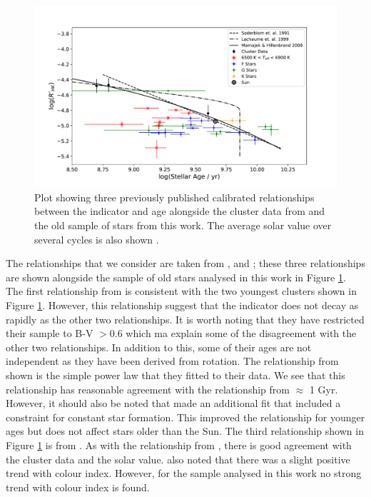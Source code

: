\begin{figure}
    \centering
    \includegraphics[scale=0.55]{Figures/4-Chromospheric_age/ca_results_3_relationship.pdf}
    \caption[Comparison of sample to previous age-activity relationships]{Plot showing three previously published calibrated relationships between the \Rprime indicator and age \citep{Soderblom_etal_1991,Lachaume_etal_1999,Mamajek_Hillenbrand_2008} alongside the cluster data from \citet{Mamajek_Hillenbrand_2008} and the old sample of stars from this work. The average solar value over several cycles is also shown \citep{Egeland_etal_2017}.}
    \label{fig:comparison_previous_relationships_ca}
\end{figure}

The relationships that we consider are taken from \citet{Soderblom_etal_1991}, \citet{Lachaume_etal_1999} and \citet{Mamajek_Hillenbrand_2008}; these three relationships are shown alongside the sample of old stars analysed in this work in Figure \ref{fig:comparison_previous_relationships_ca}. The first relationship from \citet{Lachaume_etal_1999} is consistent with the two youngest clusters shown in Figure \ref{fig:comparison_previous_relationships_ca}. However, this relationship suggest that the \Rprime indicator does not decay as rapidly as the other two relationships. It is worth noting that they have restricted their sample to B-V $> 0.6$ which ma explain some of the disagreement with the other two relationships. In addition to this, some of their ages are not independent as they have been derived from rotation. The relationship from \citet{Soderblom_etal_1991} shown is the simple power law that they fitted to their data. We see that this relationship has reasonable agreement with the \citet{Mamajek_Hillenbrand_2008} relationship from $\approx$ 1 Gyr. However, it should also be noted that \citet{Soderblom_etal_1991} made an additional fit that included a constraint for constant star formation. This improved the relationship for younger ages but does not affect stars older than the Sun. The third relationship shown in Figure \ref{fig:comparison_previous_relationships_ca} is from \citet{Mamajek_Hillenbrand_2008}. As with the relationship from \citet{Soderblom_etal_1991}, there is good agreement with the cluster data and the solar value. \citet{Mamajek_Hillenbrand_2008} also noted that there was a slight positive trend with colour index. However, for the sample analysed in this work no strong trend with colour index is found.

